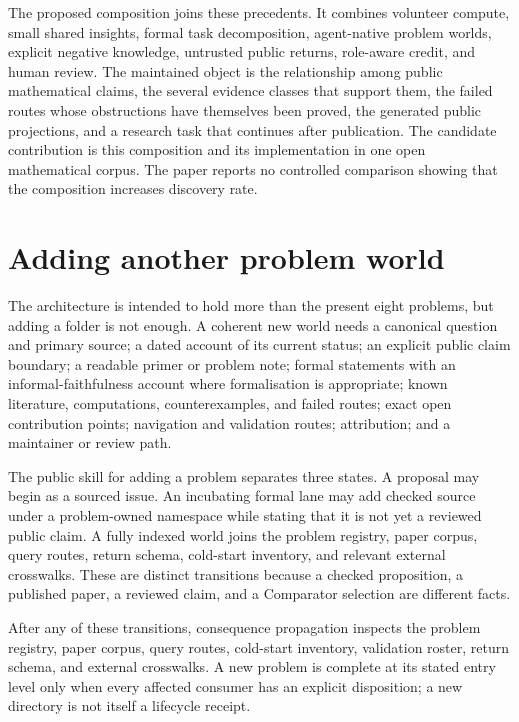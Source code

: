 \documentclass[10pt]{article}
\begin{document}
The proposed composition joins these precedents.  It combines volunteer
compute, small shared insights, formal task decomposition, agent-native
problem worlds, explicit negative knowledge, untrusted public returns,
role-aware credit, and human review.  The maintained object is the
relationship among public mathematical claims, the several evidence classes
that support them, the failed routes whose obstructions have themselves been
proved, the generated public projections, and a research task that continues
after publication.  The candidate contribution is this
composition and its implementation in one open mathematical corpus.  The
paper reports no controlled comparison showing that the composition increases
discovery rate.

\section{Adding another problem world}\label{sec:add-problem}

The architecture is intended to hold more than the present eight problems,
but adding a folder is not enough.  A coherent new world needs a canonical
question and primary source; a dated account of its current status; an explicit
public claim boundary; a readable primer or problem note; formal statements
with an informal-faithfulness account where formalisation is appropriate;
known literature, computations, counterexamples, and failed routes; exact open
contribution points; navigation and validation routes; attribution; and a
maintainer or review path.

The public skill for adding a problem separates three states.  A proposal may
begin as a sourced issue.  An incubating formal lane may add checked source
under a problem-owned namespace while stating that it is not yet a reviewed
public claim.  A fully indexed world joins the problem registry, paper corpus,
query routes, return schema, cold-start inventory, and relevant external
crosswalks.  These are distinct transitions because a checked proposition, a
published paper, a reviewed claim, and a Comparator selection are different
facts.

After any of these transitions, consequence propagation inspects the problem
registry, paper corpus, query routes, cold-start inventory, validation roster,
return schema, and external crosswalks. A new problem is complete at its stated
entry level only when every affected consumer has an explicit disposition; a
new directory is not itself a lifecycle receipt.
\end{document}

